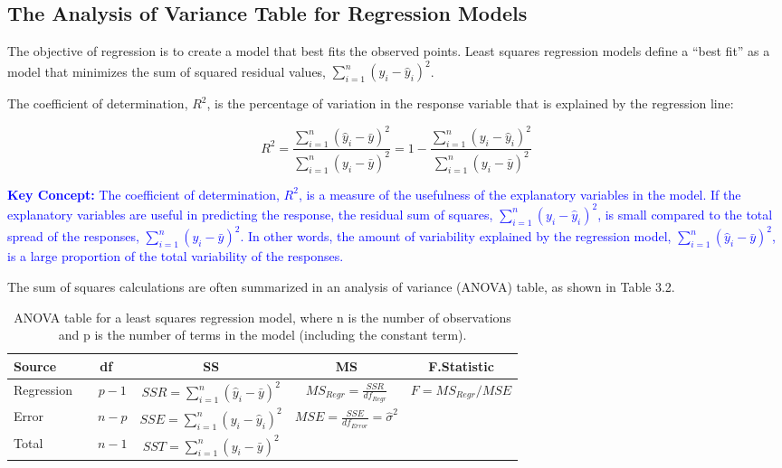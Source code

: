 \documentclass[
]{report}
\begin{document}
\hypertarget{the-analysis-of-variance-table-for-regression-models}{%
\subsection*{The Analysis of Variance Table for Regression Models}\label{the-analysis-of-variance-table-for-regression-models}}

The objective of regression is to create a model that best fits the observed points. Least squares regression models define a ``best fit'' as a model that minimizes the sum of squared residual values, \(\scriptstyle \sum_{i=1}^n (y_i - \hat{y}_i)^2\).

The coefficient of determination, \(\scriptstyle {R}^2\), is the percentage of variation in the response variable that is explained by the regression line:

\begin{equation} 
 R^2 = \frac{\sum_{i=1}^n (\hat{y}_i - \bar{y})^2}{\sum_{i=1}^n (y_i - \bar{y})^2} 
     = 1 - \frac{\sum_{i=1}^n (y_i - \hat{y}_i)^2}{\sum_{i=1}^n (y_i - \bar{y})^2} 
 \tag{3.10} 
 \end{equation}

\textbf{\textcolor{blue}{Key Concept:}}
\textcolor{blue}{The coefficient of determination, $\scriptstyle {R}^2$, is a measure of the usefulness of the explanatory variables in the model. If the explanatory variables are useful in predicting the response, the residual sum of squares, $\scriptstyle \sum_{i=1}^n (y_i - \hat{y}_i)^2$, is small compared to the total spread of the responses, $\scriptstyle \sum_{i=1}^n (y_i - \bar{y})^2$. In other words, the amount of variability explained by the regression model, $\scriptstyle \sum_{i=1}^n (\hat{y}_i - \bar{y})^2$, is a large proportion of the total variability of the responses.}

The sum of squares calculations are often summarized in an analysis of variance (ANOVA) table, as shown in Table 3.2.

\begin{table}

\caption{\label{tab:anovatable} ANOVA table for a least squares regression model, where n is the number of observations and p is the number of terms in the model (including the constant term).}
\centering
\begin{tabular}[t]{l|c|c|c|c}
\hline
Source & df & SS & MS & F.Statistic\\
\hline
Regression & $\quad p - 1$ & $\displaystyle SSR = \sum_{i=1}^n (\hat{y}_i - \bar{y})^2$ & $MS_{Regr} = \tfrac{SSR}{df_{Regr}}$ & $F = MS_{Regr}/MSE$\\
\hline
Error & $\quad n - p$ & $\displaystyle SSE = \sum_{i=1}^n (y_i - \hat{y}_i)^2$ & $MSE = \tfrac{SSE}{df_{Error}} = \hat{\sigma}^2$ & \\
\hline
Total & $\quad n - 1$ & $\displaystyle SST = \sum_{i=1}^n (y_i - \bar{y})^2$ &  & \\
\hline
\end{tabular}
\end{table}
\end{document}

